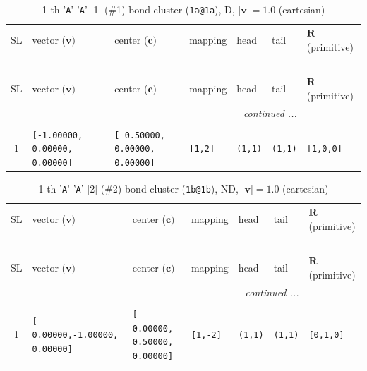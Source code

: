 \documentclass[fleqn,10pt,landscape]{jsarticle}
\begin{document}
\renewcommand{\arraystretch}{1.6}
\begin{longtable}[l]{cllllll}
\captionsetup{justification=raggedright, singlelinecheck=off}
\caption{1-th '\texttt{A}'-'\texttt{A}' [1] (\#1) bond cluster (\texttt{1a@1a}), D, $|\bm{v}|=1.0$ (cartesian)}
 \\
 \hline \hline
SL & vector ($\bm{v})$ & center ($\bm{c})$ & mapping & head & tail & $\bm{R}$ (primitive) \\ \hline \endfirsthead

\multicolumn{6}{l}{\tablename\ \thetable{}} \\
 \hline \hline
SL & vector ($\bm{v})$ & center ($\bm{c})$ & mapping & head & tail & $\bm{R}$ (primitive) \\ \hline \endhead

 \hline \hline
\multicolumn{6}{r}{\footnotesize\it continued ...} \\ \endfoot

 \hline \hline
\multicolumn{6}{r}{} \\ \endlastfoot

1 & \texttt{[-1.00000, 0.00000, 0.00000]} & \texttt{[ 0.50000, 0.00000, 0.00000]} & \texttt{[1,2]} & \texttt{(1,1)} & \texttt{(1,1)} & \texttt{[1,0,0]} \\
\end{longtable}
\renewcommand{\arraystretch}{1.6}
\begin{longtable}[l]{cllllll}
\captionsetup{justification=raggedright, singlelinecheck=off}
\caption{1-th '\texttt{A}'-'\texttt{A}' [2] (\#2) bond cluster (\texttt{1b@1b}), ND, $|\bm{v}|=1.0$ (cartesian)}
 \\
 \hline \hline
SL & vector ($\bm{v})$ & center ($\bm{c})$ & mapping & head & tail & $\bm{R}$ (primitive) \\ \hline \endfirsthead

\multicolumn{6}{l}{\tablename\ \thetable{}} \\
 \hline \hline
SL & vector ($\bm{v})$ & center ($\bm{c})$ & mapping & head & tail & $\bm{R}$ (primitive) \\ \hline \endhead

 \hline \hline
\multicolumn{6}{r}{\footnotesize\it continued ...} \\ \endfoot

 \hline \hline
\multicolumn{6}{r}{} \\ \endlastfoot

1 & \texttt{[ 0.00000,-1.00000, 0.00000]} & \texttt{[ 0.00000, 0.50000, 0.00000]} & \texttt{[1,-2]} & \texttt{(1,1)} & \texttt{(1,1)} & \texttt{[0,1,0]} \\
\end{longtable}
\end{document}
